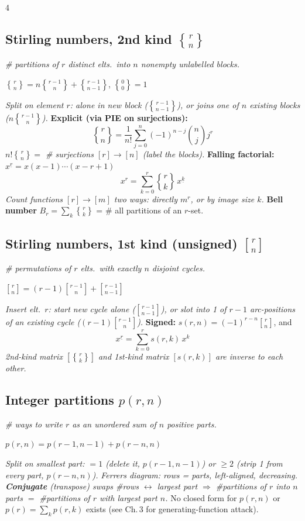 \documentclass[8pt]{extarticle}
\newcommand{\stir}[2]{\genfrac{\{}{\}}{0pt}{}{#1}{#2}}   %
\newcommand{\stirf}[2]{\genfrac{[}{]}{0pt}{}{#1}{#2}}    %
\newcommand{\note}[1]{{\footnotesize\color{gray!70!black}\emph{#1}}}
\begin{document}
\begin{multicols}{4}
\subsection*{Stirling numbers, 2nd kind $\stir{r}{n}$}
\emph{\# partitions of $r$ distinct elts.\ into $n$ nonempty unlabelled blocks.}
\begin{key}
$\stir{r}{n}=n\stir{r-1}{n}+\stir{r-1}{n-1}$, \quad $\stir{0}{0}=1$
\end{key}
\note{Split on element $r$: alone in new block ($\stir{r-1}{n-1}$), or joins one of $n$ existing blocks ($n\stir{r-1}{n}$).}
\textbf{Explicit (via PIE on surjections):}
\[ \stir{r}{n} = \frac1{n!}\sum_{j=0}^n(-1)^{n-j}\binom{n}{j}j^r \]
\note{$n!\stir{r}{n}=$ \# surjections $[r]\to[n]$ (label the blocks).}
\textbf{Falling factorial:} $x^{\underline r}=x(x-1)\cdots(x-r+1)$
\[ x^r = \sum_{k=0}^r \stir{r}{k}\, x^{\underline k} \]
\note{Count functions $[r]\to[m]$ two ways: directly $m^r$, or by image size $k$.}
\textbf{Bell number} $B_r=\sum_k\stir{r}{k}$ = \# all partitions of an $r$-set.

\subsection*{Stirling numbers, 1st kind (unsigned) $\stirf{r}{n}$}
\emph{\# permutations of $r$ elts.\ with exactly $n$ disjoint cycles.}
\begin{key}
$\stirf{r}{n}=(r-1)\stirf{r-1}{n}+\stirf{r-1}{n-1}$
\end{key}
\note{Insert elt.\ $r$: start new cycle alone ($\stirf{r-1}{n-1}$), or slot into 1 of $r-1$ arc-positions of an existing cycle ($(r-1)\stirf{r-1}{n}$).}
\textbf{Signed:} $s(r,n)=(-1)^{r-n}\stirf{r}{n}$, and
\[ x^{\underline r} = \sum_{k=0}^r s(r,k)\,x^k \]
\note{2nd-kind matrix $[\stir{r}{k}]$ and 1st-kind matrix $[s(r,k)]$ are inverse to each other.}

\subsection*{Integer partitions $p(r,n)$}
\emph{\# ways to write $r$ as an unordered sum of $n$ positive parts.}
\begin{key}
$p(r,n) = p(r-1,n-1) + p(r-n,n)$
\end{key}
\note{Split on smallest part: $=1$ (delete it, $p(r-1,n-1)$) or $\ge2$ (strip 1 from every part, $p(r-n,n)$).}
\note{Ferrers diagram: rows = parts, left-aligned, decreasing. \textbf{Conjugate} (transpose) swaps \#rows $\leftrightarrow$ largest part $\Rightarrow$ \#partitions of $r$ into $n$ parts $=$ \#partitions of $r$ with largest part $n$.}
No closed form for $p(r,n)$ or $p(r)=\sum_k p(r,k)$ exists (see Ch.\,3 for generating-function attack).


\end{multicols}
\end{document}
